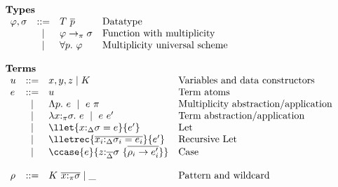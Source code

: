 
\begin{figure}[h]
\begin{framed}
\[
\begin{array}{l}
%
\textbf{Types} \\
\begin{array}{lcll}
    \varphi,\sigma  & ::=  & T~\overline{p}         & \textrm{Datatype} \\
                    & \mid & \varphi \to_\pi \sigma & \textrm{Function with multiplicity}\\
                    & \mid & \forall p.~\varphi     & \textrm{Multiplicity universal scheme}\\
\end{array}\\\\
%
\textbf{Terms}\\
\begin{array}{lcll}
    u                & ::=  & x,y,z \mid K                                                     & \textrm{Variables and data constructors}\\
    e                & ::=  & u                                                                & \textrm{Term atoms}\\
                     & \mid & \Lambda p.~e~\mid~e~\pi                                          & \textrm{Multiplicity abstraction/application}\\
                     & \mid & \lambda x{:}_\pi\sigma.~e~\mid~e~e'                           & \textrm{Term abstraction/application}\\
                     & \mid & \llet{x{:}_\Delta\sigma = e}{e'}                              & \textrm{Let} \\
                     & \mid & \lletrec{\overline{x_i{:}_\Delta\sigma_i = e_i}}{e'}             & \textrm{Recursive Let} \\
                     & \mid &
                     \ccase{e}{z{:}_{\overline{\Delta}}\sigma~\{\overline{\rho_i\to e'_i}\}}   & \textrm{Case} \\
                     &      &                                                                  & \\
    \rho             & ::=  & K~\overline{x{:}_\pi\sigma} \mid \_                              & \textrm{Pattern and wildcard} \\

\end{array}
\end{array}\]
\end{framed}
\end{figure}
